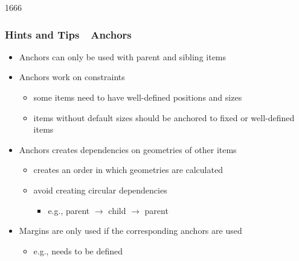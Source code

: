 \begin{slide}{1666}
\frametitle{Hints and Tips~\textendash~Anchors}

\begin{itemize}
\item Anchors can only be used with parent and sibling items
\item Anchors work on constraints
  \begin{itemize}
  \item some items need to have well-defined positions and sizes
  \item items without default sizes should be anchored to fixed or well-defined items
  \end{itemize}
\item Anchors creates dependencies on geometries of other items
  \begin{itemize}
  \item creates an order in which geometries are calculated
  \item avoid creating circular dependencies
    \begin{itemize}
    \item e.g., parent $\rightarrow$ child $\rightarrow$ parent
    \end{itemize}
  \end{itemize}
\item Margins are only used if the corresponding anchors are used
  \begin{itemize}
  \item e.g.,  needs  to be defined
  \end{itemize}
\end{itemize}

\end{slide}


